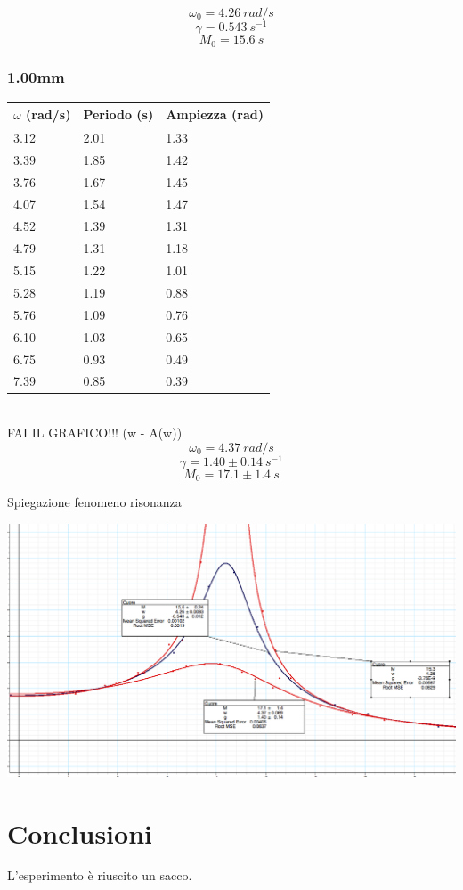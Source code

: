 \documentclass[a4paper,10pt]{report}
\begin{document}
$$ \omega_0 = 4.26\ rad/s $$
$$ \gamma = 0.543\ s^{-1} $$
$$ M_0 = 15.6\ s$$


\subsubsection{1.00mm}
\begin{tabular}{l|l|l}
$\omega$ (rad/s) & Periodo (s) & Ampiezza (rad) \\
\midrule
3.12 & 2.01 & 1.33 \\
3.39 & 1.85 & 1.42 \\
3.76 & 1.67 & 1.45 \\
4.07 & 1.54 & 1.47 \\
4.52 & 1.39 & 1.31 \\
4.79 & 1.31 & 1.18 \\
5.15 & 1.22 & 1.01 \\
5.28 & 1.19 & 0.88 \\
5.76 & 1.09 & 0.76 \\
6.10 & 1.03 & 0.65 \\
6.75 & 0.93 & 0.49 \\
7.39 & 0.85 & 0.39 \\
\midrule
\end{tabular}
\\
FAI IL GRAFICO!!! (w - A(w))
\\

$$ \omega_0 = 4.37\ rad/s $$
$$ \gamma = 1.40 \pm 0.14\ s^{-1}$$
$$ M_0 = 17.1 \pm 1.4\ s$$

Spiegazione fenomeno risonanza

\includegraphics[scale=0.2]{graf}


\section{Conclusioni}
L'esperimento è riuscito un sacco.
\end{document}
